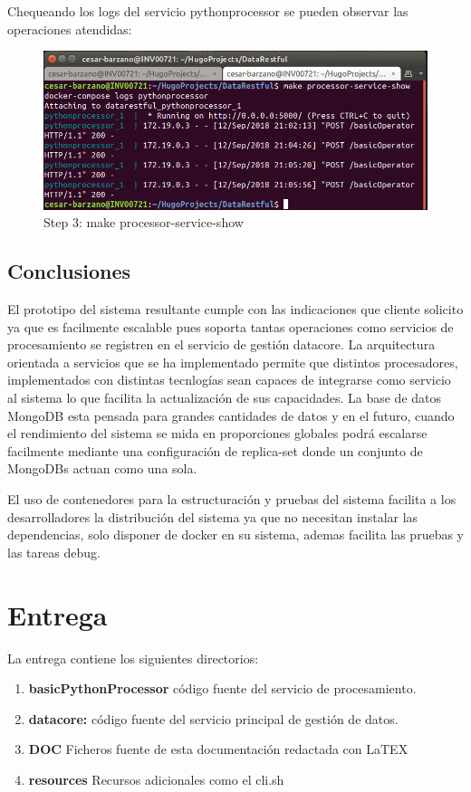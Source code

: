 \documentclass[a4paper,11pt]{book}
\begin{document}
Chequeando los logs del servicio pythonprocessor se pueden observar las operaciones atendidas: 

\begin{figure}[H]  
\centering 
\includegraphics[scale=0.35]{imagenes/ope4.png}
\caption{ Step 3: make processor-service-show }  
\end{figure}


\section{Conclusiones}

El prototipo del sistema resultante cumple con las indicaciones que cliente solicito ya que es facilmente escalable pues soporta tantas operaciones como servicios de procesamiento se registren en el servicio de gestión datacore. La arquitectura orientada a servicios que se ha implementado permite que distintos procesadores, implementados con distintas tecnlogías sean capaces de integrarse como servicio al sistema lo que facilita la actualización de sus capacidades. La base de datos MongoDB esta pensada para grandes cantidades de datos y en el futuro, cuando el rendimiento del sistema se mida en proporciones globales podrá escalarse facilmente mediante una configuración de replica-set donde un conjunto de MongoDBs actuan como una sola. 


El uso de contenedores para la estructuración y pruebas del sistema facilita a los desarrolladores la distribución del sistema ya que no necesitan instalar las dependencias, solo disponer de docker en su sistema, ademas facilita las pruebas y las tareas debug. 
 
 
\chapter{Entrega}

La entrega contiene los siguientes directorios:  

\begin{enumerate}
\item \textbf{basicPythonProcessor} código fuente del servicio de procesamiento.
\item \textbf{datacore:} código fuente del servicio principal de gestión de datos.
\item \textbf{DOC} Ficheros fuente de esta documentación redactada con LaTEX
\item \textbf{resources} Recursos adicionales como el cli.sh
\end{enumerate}
\end{document}
